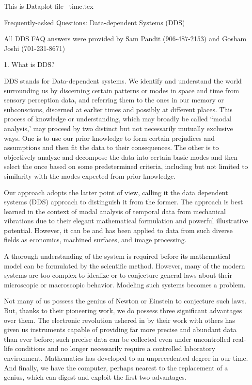 This is Dataplot file    ~time\ddsfaqs.tex
 
Frequently-asked Questions:  Data-dependent Systems (DDS)
 
 
All DDS FAQ answers were provided by
   Sam Pandit   (906-487-2153) and
   Gosham Joshi (701-231-8671)
 
 
1. What is DDS?
 
DDS stands for Data-dependent systems.
We identify and understand the world surrounding
us by discerning certain patterns or modes in
space and time from sensory perception data, and
referring them to the ones in our memory or
subconscious, discerned at earlier times and
possibly at different places.  This process of
knowledge or understanding, which may broadly be
called ``modal analysis,' may proceed by two
distinct but not necessarily mutually exclusive
ways.  One is to use our prior knowledge to form
certain prejudices and assumptions and then fit
the data to their consequences.  The other is to
objectively analyze and decompose the data into
certain basic modes and then select the once based
on some predetermined criteria, including but not
limited to similarity with the modes expected from
prior knowledge.
 
Our approach adopts the latter point of view,
calling it the data dependent systems (DDS)
approach to distinguish it from the former.  The
approach is best learned in the context of modal
analysis of temporal data from mechanical
vibrations due to their elegant mathematical
formulation and powerful illustrative potential.
However, it can be and has been applied to data
from such diverse fields as economics, machined
surfaces, and image processing.
 
A thorough understanding of the system is required
before its mathematical model can be formulated by
the scientific method.  However, many of the
modern systems are too complex to idealize or to
conjecture general laws about their microscopic or
macroscopic behavior.  Modeling such systems
becomes a problem.
 
Not many of us possess the genius of Newton or
Einstein to conjecture such laws.  But, thanks to
their pioneering work, we do possess three
significant advantages over them.  The electronic
revolution ushered in by their work with others
has given us instruments capable of providing far
more precise and abundant data than ever before;
such precise data can be collected even under
uncontrolled real-life conditions and no longer
necessarily require a controlled laboratory
environment.  Mathematics has developed to an
unprecedented degree in our time.  And finally, we
have the computer, perhaps nearest to the
replacement of a genius, which can digest and
exploit the first two advantages.
 
